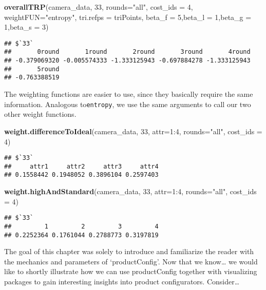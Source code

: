 \documentclass[]{article}
\newenvironment{Shaded}{\begin{snugshade}}{\end{snugshade}}
\newcommand{\KeywordTok}[1]{\textcolor[rgb]{0.13,0.29,0.53}{\textbf{{#1}}}}
\newcommand{\DataTypeTok}[1]{\textcolor[rgb]{0.13,0.29,0.53}{{#1}}}
\newcommand{\DecValTok}[1]{\textcolor[rgb]{0.00,0.00,0.81}{{#1}}}
\newcommand{\StringTok}[1]{\textcolor[rgb]{0.31,0.60,0.02}{{#1}}}
\newcommand{\NormalTok}[1]{{#1}}
\begin{document}
\begin{Shaded}
\begin{Highlighting}[]
\KeywordTok{overallTRP}\NormalTok{(camera_data, }\DecValTok{33}\NormalTok{, }\DataTypeTok{rounds=}\StringTok{"all"}\NormalTok{, }\DataTypeTok{cost_ids =} \DecValTok{4}\NormalTok{, }\DataTypeTok{weightFUN=}\StringTok{"entropy"}\NormalTok{,}
           \DataTypeTok{tri.refps =} \NormalTok{triPoints, }\DataTypeTok{beta_f =} \DecValTok{5}\NormalTok{,}\DataTypeTok{beta_l =} \DecValTok{1}\NormalTok{,}\DataTypeTok{beta_g =} \DecValTok{1}\NormalTok{,}\DataTypeTok{beta_s =} \DecValTok{3}\NormalTok{)}
\end{Highlighting}
\end{Shaded}

\begin{verbatim}
## $`33`
##       0round       1round       2round       3round       4round 
## -0.379069320 -0.005574333 -1.333125943 -0.697884278 -1.333125943 
##       5round 
## -0.763388519
\end{verbatim}

The weighting functions are easier to use, since they basically require
the same information. Analogous to\texttt{entropy}, we use the same
arguments to call our two other weight functions.

\begin{Shaded}
\begin{Highlighting}[]
\KeywordTok{weight.differenceToIdeal}\NormalTok{(camera_data, }\DecValTok{33}\NormalTok{, }\DataTypeTok{attr=}\DecValTok{1}\NormalTok{:}\DecValTok{4}\NormalTok{, }\DataTypeTok{rounds=}\StringTok{"all"}\NormalTok{, }\DataTypeTok{cost_ids =} \DecValTok{4}\NormalTok{)}
\end{Highlighting}
\end{Shaded}

\begin{verbatim}
## $`33`
##     attr1     attr2     attr3     attr4 
## 0.1558442 0.1948052 0.3896104 0.2597403
\end{verbatim}

\begin{Shaded}
\begin{Highlighting}[]
\KeywordTok{weight.highAndStandard}\NormalTok{(camera_data, }\DecValTok{33}\NormalTok{, }\DataTypeTok{attr=}\DecValTok{1}\NormalTok{:}\DecValTok{4}\NormalTok{, }\DataTypeTok{rounds=}\StringTok{"all"}\NormalTok{, }\DataTypeTok{cost_ids =} \DecValTok{4}\NormalTok{)}
\end{Highlighting}
\end{Shaded}

\begin{verbatim}
## $`33`
##         1         2         3         4 
## 0.2252364 0.1761044 0.2788773 0.3197819
\end{verbatim}

The goal of this chapter was solely to introduce and familiarize the
reader with the mechanics and parameters of `productConfig'. Now that we
know\ldots{} we would like to shortly illustrate how we can use
productConfig together with visualizing packages to gain interesting
insights into product configurators. Consider\ldots{}
\end{document}

